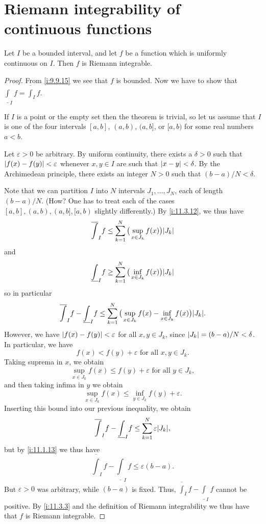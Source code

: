 \section{Riemann integrability of continuous functions}\label{i:sec:11.5}

\begin{thm}\label{i:11.5.1}
  Let \(I\) be a bounded interval, and let \(f\) be a function which is uniformly continuous on \(I\).
  Then \(f\) is Riemann integrable.
\end{thm}

\begin{proof}
  From \cref{i:9.9.15} we see that \(f\) is bounded.
  Now we have to show that \(\underline{\int}_I f = \overline{\int}_I f\).

  If \(I\) is a point or the empty set then the theorem is trivial, so let us assume that \(I\) is one of the four intervals \([a, b]\), \((a, b)\), \((a, b]\), or \([a, b)\) for some real numbers \(a < b\).

      Let \(\varepsilon > 0\) be arbitrary.
      By uniform continuity, there exists a \(\delta > 0\) such that \(\left\lvert f(x) - f(y)\right\rvert < \varepsilon\) whenever \(x, y \in I\) are such that \(\left\lvert x - y\right\rvert < \delta\).
      By the Archimedean principle, there exists an integer \(N > 0\) such that \((b - a) / N < \delta\).

      Note that we can partition \(I\) into \(N\) intervals \(J_1, \dots, J_N\), each of length \((b - a) / N\).
      (How? One has to treat each of the cases \([a, b], (a, b), (a, b], [a, b)\) slightly differently.)
  By \cref{i:11.3.12}, we thus have
  \[
    \overline{\int}_I f \leq \sum_{k = 1}^N \big(\sup_{x \in J_k} f(x)\big) \abs{J_k}
  \]
  and
  \[
    \underline{\int}_I f \geq \sum_{k = 1}^N \big(\inf_{x \in J_k} f(x)\big) \abs{J_k}
  \]
  so in particular
  \[
    \overline{\int}_I f - \underline{\int}_I f \leq \sum_{k = 1}^N \big(\sup_{x \in J_k} f(x) - \inf_{x \in J_k} f(x)\big) \abs{J_k}.
  \]
  However, we have \(\left\lvert f(x) - f(y)\right\rvert < \varepsilon\) for all \(x, y \in J_k\), since \(\left\lvert J_k\right\rvert = (b - a) / N < \delta\).
  In particular, we have
  \[
    f(x) < f(y) + \varepsilon \text{ for all } x, y \in J_k.
  \]
  Taking suprema in \(x\), we obtain
  \[
    \sup_{x \in J_k} f(x) \leq f(y) + \varepsilon \text{ for all } y \in J_k,
  \]
  and then taking infima in \(y\) we obtain
  \[
    \sup_{x \in J_k} f(x) \leq \inf_{y \in J_k} f(y) + \varepsilon.
  \]
  Inserting this bound into our previous inequality, we obtain
  \[
    \overline{\int}_I f - \underline{\int}_I f \leq \sum_{k = 1}^N \varepsilon \abs{J_k},
  \]
  but by \cref{i:11.1.13} we thus have
  \[
    \overline{\int}_I f - \underline{\int}_I f \leq \varepsilon (b - a).
  \]
  But \(\varepsilon > 0\) was arbitrary, while \((b - a)\) is fixed.
  Thus, \(\overline{\int}_I f - \underline{\int}_I f\) cannot be positive.
  By \cref{i:11.3.3} and the definition of Riemann integrability we thus have that \(f\) is Riemann integrable.
\end{proof}

